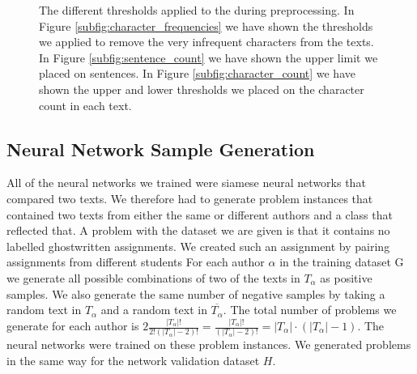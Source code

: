 \begin{figure}[htb]
\begin{minipage}{.5\linewidth}
{        }
    \end{minipage}\par\medskip
    \centering

    \caption{The different thresholds applied to the during preprocessing. In
        Figure \ref{subfig:character_frequencies} we have shown the thresholds
        we applied to remove the very infrequent characters from the texts. In
        Figure \ref{subfig:sentence_count} we have shown the upper limit we
        placed on sentences. In Figure \ref{subfig:character_count} we have
        shown the upper and lower thresholds we placed on the character count in
        each text.
    }
    \label{fig:cutoff_thresholds}
\end{figure}


\subsection{Neural Network Sample Generation} \label{subsec:problem_generation}

All of the neural networks we trained were siamese neural networks that
compared two texts. We therefore had to generate problem instances that
contained two texts from either the same or different authors and a class
that reflected that. A problem with the dataset we are given is that it
contains no labelled ghostwritten assignments. We created such an assignment
by pairing assignments from different students For each author $\alpha$ in
the training dataset \gls{G} we generate all possible combinations of two
of the texts in $T_\alpha$ as positive samples. We also generate the same
number of negative samples by taking a random text in $T_\alpha$ and a random
text in $\overline{T_\alpha}$. The total number of problems we generate for
each author is $2\frac{\left|T_\alpha\right|!}{2!(\left|T_\alpha\right|-2)!}
= \frac{\left|T_\alpha\right|!}{(\left|T_\alpha\right|-2)!} =
\left|T_\alpha\right| \cdot (\left|T_\alpha\right| - 1) $. The neural networks
were trained on these problem instances. We generated problems in the same way
for the network validation dataset $H$.
